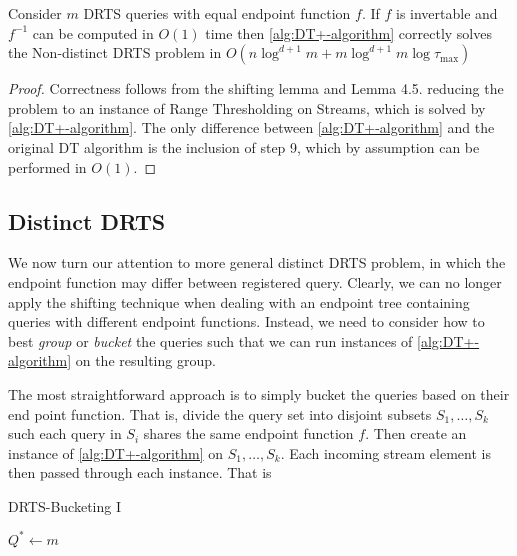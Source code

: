 \begin{theorem}
    Consider $m$ DRTS queries with equal endpoint function $f$. If $f$ is invertable and $f^{-1}$ can be computed in $O(1)$ time then \cref{alg:DT+-algorithm} correctly solves the Non-distinct DRTS problem in $O(n\log^{d+1}m + m\log^{d+1}m\log\tau_{\max})$
\end{theorem}
\begin{proof}
    Correctness follows from the shifting lemma and Lemma 4.5. reducing the problem to an instance of Range Thresholding on Streams, which is solved by \cref{alg:DT+-algorithm}. The only difference between \cref{alg:DT+-algorithm} and the original DT algorithm is the inclusion of step 9, which by assumption can be performed in $O(1)$. 
\end{proof}

\newpage
\subsection{Distinct DRTS}
\label{ssec:distinc-DRTS}
We now turn our attention to more general distinct DRTS problem, in which the endpoint function may differ between registered query. Clearly, we can no longer apply the shifting technique when dealing with an endpoint tree containing queries with different endpoint functions. Instead, we need to consider how to best \textit{group} or \textit{bucket} the queries such that we can run instances of \cref{alg:DT+-algorithm} on the resulting group.

The most straightforward approach is to simply bucket the queries based on their end point function. That is, divide the query set into disjoint subsets $S_1,\dots, S_k$ such each query in $S_i$ shares the same endpoint function $f$. Then create an instance of \cref{alg:DT+-algorithm} on $S_1,\dots,S_k$. Each incoming stream element is then passed through each instance. That is

\begin{algorithm}
\caption{DRTS-Bucketing I}\label{alg:DRTS-bucketing}
\begin{algorithmic}[1]
\Require $Q^* \gets m$ 
\State {}
\State {}
    \State {} 
\EndFor
\end{algorithmic}
\end{algorithm}

